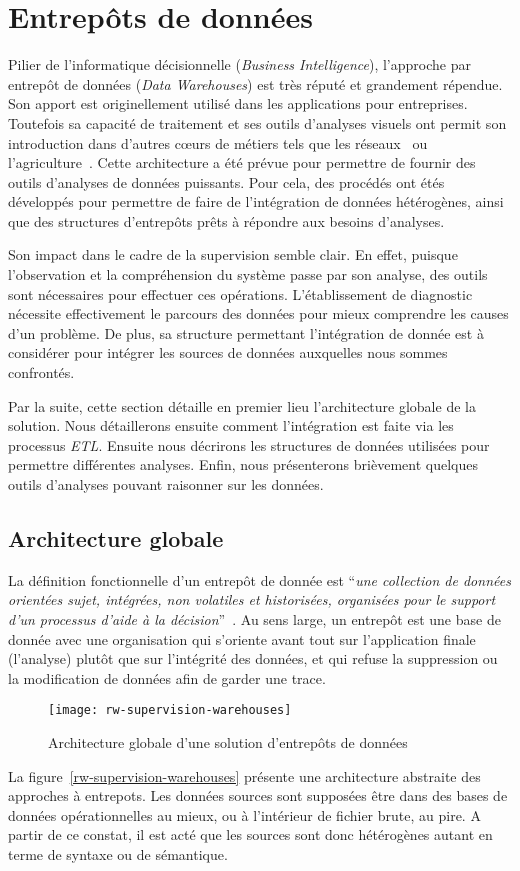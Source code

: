 \section{Entrepôts de données}\label{sec:rw:supervision:warehouse}
Pilier de l'informatique décisionnelle (\textit{Business Intelligence}), l'approche par entrepôt de données (\textit{Data Warehouses}) est très réputé et grandement répendue. Son apport est originellement utilisé dans les applications pour entreprises. Toutefois sa capacité de traitement et ses outils d'analyses visuels ont permit son introduction dans d'autres cœurs de métiers tels que les réseaux~\cite{refneeded} ou l'agriculture~\cite{Abdullah:olap}. Cette architecture a été prévue pour permettre de fournir des outils d'analyses de données puissants. Pour cela, des procédés ont étés développés pour permettre de faire de l'intégration de données hétérogènes, ainsi que des structures d'entrepôts prêts à répondre aux besoins d'analyses.

Son impact dans le cadre de la supervision semble clair. En effet, puisque l'observation et la compréhension du système passe par son analyse, des outils sont nécessaires pour effectuer ces opérations. L'établissement de diagnostic nécessite effectivement le parcours des données pour mieux comprendre les causes d'un problème. De plus, sa structure permettant l'intégration de donnée est à considérer pour intégrer les sources de données auxquelles nous sommes confrontés.

Par la suite, cette section détaille en premier lieu l'architecture globale de la solution. Nous détaillerons ensuite comment l'intégration est faite via les processus \textit{ETL}. Ensuite nous décrirons les structures de données utilisées pour permettre différentes analyses. Enfin, nous présenterons brièvement quelques outils d'analyses pouvant raisonner sur les données.

\subsection{Architecture globale}
La définition fonctionnelle d'un entrepôt de donnée est \enquote{\it une collection de données orientées sujet, intégrées, non volatiles et historisées, organisées pour le support d’un processus d’aide à la décision}~\cite{Inmon:warehouse}. Au sens large, un entrepôt est une base de donnée avec une organisation qui s'oriente avant tout sur l'application finale (l'analyse) plutôt que sur l'intégrité des données, et qui refuse la suppression ou la modification de données afin de garder une trace.
\begin{figure}[ht]
	\centering
	\texttt{[image: rw-supervision-warehouses]}
	\caption{Architecture globale d'une solution d'entrepôts de données}\label{fig:rw:supervision:warehouses}
\end{figure}
La figure~\ref{rw-supervision-warehouses} présente une architecture abstraite des approches à entrepots. Les données sources sont supposées être dans des bases de données opérationnelles au mieux, ou à l'intérieur de fichier brute, au pire. A partir de ce constat, il est acté que les sources sont donc hétérogènes autant en terme de syntaxe ou de sémantique.

